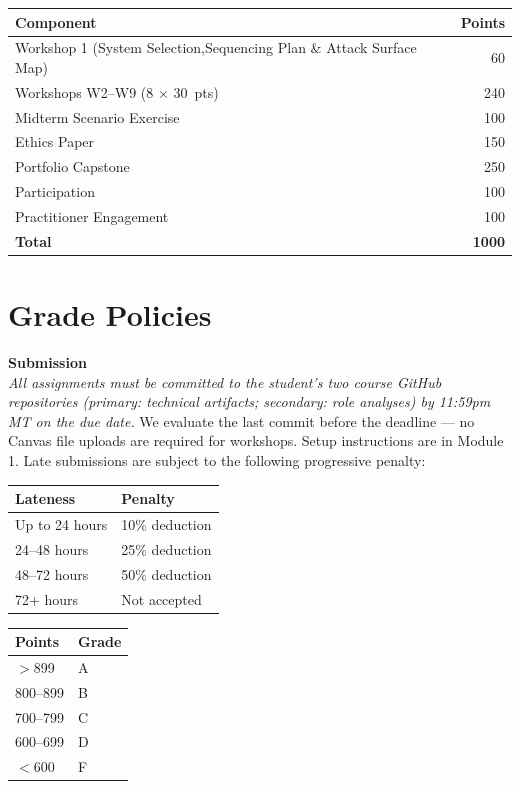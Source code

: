 \documentclass[9pt]{extarticle}
\begin{document}
\begin{minipage}[t]{0.48\textwidth}
\vspace{0pt}
\begin{tabular}{p{6.0cm}r}
\toprule
\textbf{Component} & \textbf{Points} \\
\midrule
Workshop 1 (System Selection,\newline Sequencing Plan \& Attack Surface Map) & 60 \\
Workshops W2--W9 (8 $\times$ 30~pts) & 240 \\
Midterm Scenario Exercise & 100 \\
Ethics Paper & 150 \\
Portfolio Capstone & 250 \\
Participation & 100 \\
Practitioner Engagement & 100 \\
\midrule
\textbf{Total} & \textbf{1000} \\
\bottomrule
\end{tabular}
\end{minipage}

\newpage
\section*{Grade Policies}

\textbf{Submission} \\
\textit{All assignments must be committed to the student's two course GitHub repositories
(primary: technical artifacts; secondary: role analyses) by 11:59pm MT on the due date.}
We evaluate the last commit before the deadline --- no Canvas file uploads are required for workshops.
Setup instructions are in Module 1. Late submissions are subject to the following
progressive penalty:

\medskip

\begin{minipage}[t]{0.45\textwidth}
\raggedright
\begin{tabular}{ll}
\toprule
\textbf{Lateness} & \textbf{Penalty} \\
\midrule
Up to 24 hours   & 10\% deduction \\
24--48 hours     & 25\% deduction \\
48--72 hours     & 50\% deduction \\
72+ hours        & Not accepted \\
\bottomrule
\end{tabular}
\end{minipage}%
\hfill
\begin{minipage}[t]{0.45\textwidth}
\raggedright
\begin{tabular}{ll}
\toprule
\textbf{Points} & \textbf{Grade} \\
\midrule
$>$899   & A \\
800--899 & B \\
700--799 & C \\
600--699 & D \\
$<$600   & F \\
\bottomrule
\end{tabular}
\end{minipage}
\end{document}
